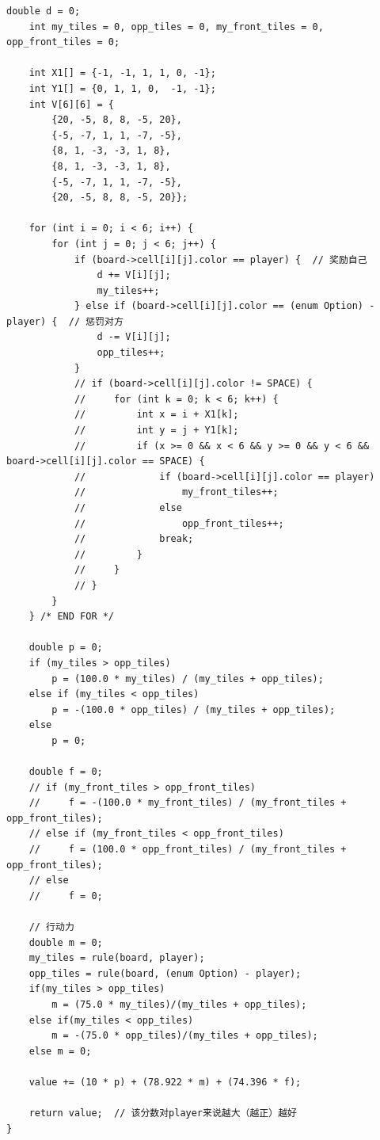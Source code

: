 \documentclass[a4paper, 11pt]{article}
\begin{document}
\begin{lstlisting}[title=Othello.cpp]
    double d = 0;
    int my_tiles = 0, opp_tiles = 0, my_front_tiles = 0, opp_front_tiles = 0;

	int X1[] = {-1, -1, 1, 1, 0, -1};
	int Y1[] = {0, 1, 1, 0,  -1, -1};
    int V[6][6] = {
        {20, -5, 8, 8, -5, 20},
        {-5, -7, 1, 1, -7, -5},
        {8, 1, -3, -3, 1, 8},
        {8, 1, -3, -3, 1, 8},
        {-5, -7, 1, 1, -7, -5},
        {20, -5, 8, 8, -5, 20}};

    for (int i = 0; i < 6; i++) {
        for (int j = 0; j < 6; j++) {
            if (board->cell[i][j].color == player) {  // 奖励自己
                d += V[i][j];
                my_tiles++;
            } else if (board->cell[i][j].color == (enum Option) - player) {  // 惩罚对方
                d -= V[i][j];
                opp_tiles++;
            }
            // if (board->cell[i][j].color != SPACE) {
            //     for (int k = 0; k < 6; k++) {
            //         int x = i + X1[k];
            //         int y = j + Y1[k];
            //         if (x >= 0 && x < 6 && y >= 0 && y < 6 && board->cell[i][j].color == SPACE) {
            //             if (board->cell[i][j].color == player)
            //                 my_front_tiles++;
            //             else
            //                 opp_front_tiles++;
            //             break;
            //         }
            //     }
            // }
        }
    } /* END FOR */

    double p = 0;
    if (my_tiles > opp_tiles)
        p = (100.0 * my_tiles) / (my_tiles + opp_tiles);
    else if (my_tiles < opp_tiles)
        p = -(100.0 * opp_tiles) / (my_tiles + opp_tiles);
    else
        p = 0;

    double f = 0;
    // if (my_front_tiles > opp_front_tiles)
    //     f = -(100.0 * my_front_tiles) / (my_front_tiles + opp_front_tiles);
    // else if (my_front_tiles < opp_front_tiles)
    //     f = (100.0 * opp_front_tiles) / (my_front_tiles + opp_front_tiles);
    // else
    //     f = 0;

    // 行动力
    double m = 0;
	my_tiles = rule(board, player);
	opp_tiles = rule(board, (enum Option) - player);
	if(my_tiles > opp_tiles)
		m = (75.0 * my_tiles)/(my_tiles + opp_tiles);
	else if(my_tiles < opp_tiles)
		m = -(75.0 * opp_tiles)/(my_tiles + opp_tiles);
	else m = 0;

    value += (10 * p) + (78.922 * m) + (74.396 * f);

    return value;  // 该分数对player来说越大（越正）越好
}
\end{lstlisting}
\end{document}
